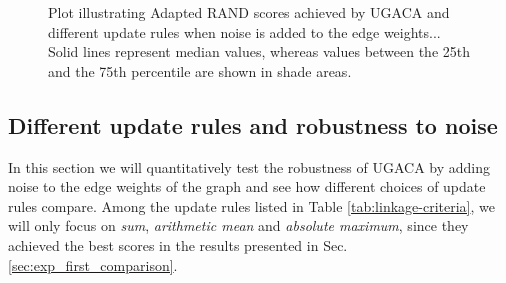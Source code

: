 \begin{figure}
\caption{Plot illustrating Adapted RAND scores achieved by UGACA and different update rules when noise is added to the edge weights... Solid lines represent median values, whereas values between the 25th and the 75th percentile are shown in shade areas.    }\label{fig:noise_plots}
\end{figure}





\subsection{Different update rules and robustness to noise}
 In this section we will quantitatively test the robustness of UGACA by adding noise to the edge weights of the graph and see how different choices of update rules compare.
 Among the update rules listed in Table \ref{tab:linkage-criteria}, we will only focus on \emph{sum}, \emph{arithmetic mean} and \emph{absolute maximum}, since they achieved the best scores in the results presented in Sec. \ref{sec:exp_first_comparison}. %

